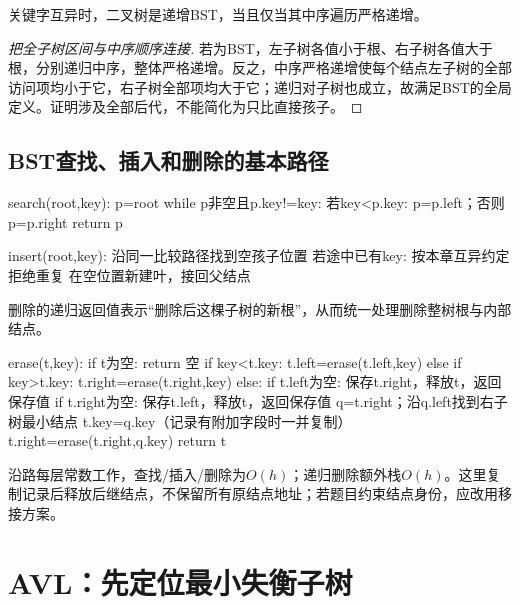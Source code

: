 \begin{theorem}[BST的中序判据]

关键字互异时，二叉树是递增BST，当且仅当其中序遍历严格递增。

\end{theorem}

\begin{proof}[把全子树区间与中序顺序连接]

若为BST，左子树各值小于根、右子树各值大于根，分别递归中序，整体严格递增。反之，中序严格递增使每个结点左子树的全部访问项均小于它，右子树全部项均大于它；递归对子树也成立，故满足BST的全局定义。证明涉及全部后代，不能简化为只比直接孩子。

\end{proof}

\subsection{BST查找、插入和删除的基本路径}\label{DS07-bst-code}

\begin{codeblock}[language={}]
search(root,key):
    p=root
    while p非空且p.key!=key:
        若key<p.key: p=p.left；否则p=p.right
    return p

insert(root,key):
    沿同一比较路径找到空孩子位置
    若途中已有key: 按本章互异约定拒绝重复
    在空位置新建叶，接回父结点
\end{codeblock}

删除的递归返回值表示``删除后这棵子树的新根''，从而统一处理删除整树根与内部结点。

\begin{codeblock}[language={}]
erase(t,key):
    if t为空: return 空
    if key<t.key: t.left=erase(t.left,key)
    else if key>t.key: t.right=erase(t.right,key)
    else:
        if t.left为空: 保存t.right，释放t，返回保存值
        if t.right为空: 保存t.left，释放t，返回保存值
        q=t.right；沿q.left找到右子树最小结点
        t.key=q.key（记录有附加字段时一并复制）
        t.right=erase(t.right,q.key)
    return t
\end{codeblock}

沿路每层常数工作，查找/插入/删除为\(O(h)\)；递归删除额外栈\(O(h)\)。这里复制记录后释放后继结点，不保留所有原结点地址；若题目约束结点身份，应改用移接方案。

\section{AVL：先定位最小失衡子树}\label{DS07-05}

